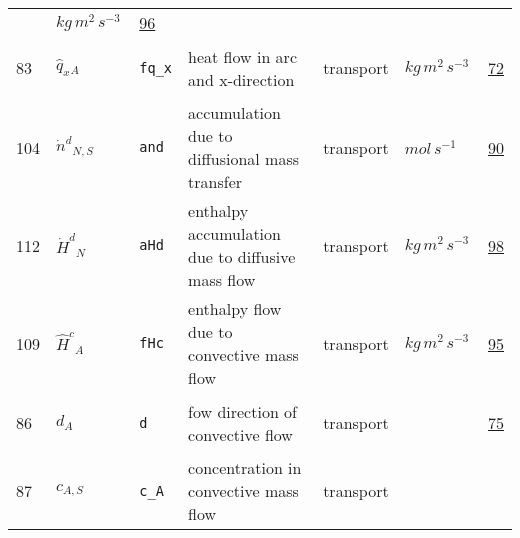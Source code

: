 \begin{longtable}{|p{1cm}|p{2.5cm}|p{4.5cm}|p{8cm}|p{3.0cm}|p{3cm}|p{1cm}|}
             & $ kg \,m^{2} \,s^{-3} \, $
             &                 \hyperlink{"e:96"}{ 96 }
                 \\
            83
             & \hypertarget{"v:83"}{ $ {{\hat{q}_x}}{_{A}} $}
             & \verb|fq_x|
             & heat flow in arc and x-direction
             & \begin{lay}transport \end{lay}
             & $ kg \,m^{2} \,s^{-3} \, $
             &                 \hyperlink{"e:72"}{ 72 }
                 \\
            104
             & \hypertarget{"v:104"}{ $ {{\dot{n}^d}}{_{N, S}} $}
             & \verb|and|
             & accumulation due to diffusional mass transfer
             & \begin{lay}transport \end{lay}
             & $ mol \,s^{-1} \, $
             &                 \hyperlink{"e:90"}{ 90 }
                 \\
            112
             & \hypertarget{"v:112"}{ $ {{\dot{H}^d}}{_{N}} $}
             & \verb|aHd|
             & enthalpy accumulation due to diffusive mass flow
             & \begin{lay}transport \end{lay}
             & $ kg \,m^{2} \,s^{-3} \, $
             &                 \hyperlink{"e:98"}{ 98 }
                 \\
            109
             & \hypertarget{"v:109"}{ $ {{\hat{H}^c}}{_{A}} $}
             & \verb|fHc|
             & enthalpy flow due to convective mass flow
             & \begin{lay}transport \end{lay}
             & $ kg \,m^{2} \,s^{-3} \, $
             &                 \hyperlink{"e:95"}{ 95 }
                 \\
            86
             & \hypertarget{"v:86"}{ $ {d}{_{A}} $}
             & \verb|d|
             & fow direction of convective flow
             & \begin{lay}transport \end{lay}
             & $  $
             &                 \hyperlink{"e:75"}{ 75 }
                 \\
            87
             & \hypertarget{"v:87"}{ $ {c}{_{A, S}} $}
             & \verb|c_A|
             & concentration in convective mass flow
             & \begin{lay}transport \end{lay}

\end{longtable}

